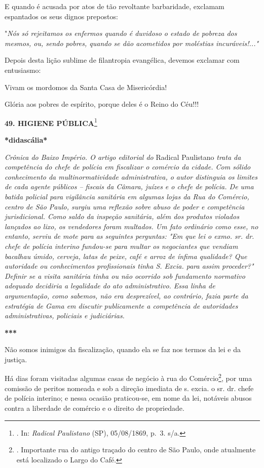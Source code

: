 E quando é acusada por atos de tão revoltante barbaridade, exclamam
espantados os seus dignos prepostos:

"\emph{Nós só rejeitamos os enfermos quando é duvidoso o estado de
pobreza dos mesmos, ou, sendo pobres, quando se dão acometidos por
moléstias incuráveis!..."}

Depois desta lição sublime de filantropia evangélica, devemos exclamar
com entusiasmo:

Vivam os mordomos da Santa Casa de Misericórdia!

Glória aos pobres de espírito, porque deles é o Reino do Céu!!!

\textbf{49. HIGIENE PÚBLICA}\footnote{. In: \emph{Radical Paulistano}
  (SP), 05/08/1869, p.~3. s/a.}

\textbf{*didascália*}

\emph{Crônica do Baixo Império. O artigo editorial do} Radical
Paulistano \emph{trata da competência do chefe de polícia em fiscalizar
o comércio da cidade. Com sólido conhecimento da multinormatividade
administrativa, o autor distinguia os limites de cada agente públicos --
fiscais da Câmara, juízes e o chefe de polícia. De uma batida policial
para vigilância sanitária em algumas lojas da Rua do Comércio, centro de
São Paulo, surgiu uma reflexão sobre abuso de poder e competência
jurisdicional. Como saldo da inspeção sanitária, além dos produtos
violados lançados ao lixo, os vendedores foram multados. Um fato
ordinário como esse, no entanto, serviu de mote para as seguintes
perguntas: "Em que lei o exmo. sr. dr. chefe de polícia interino
fundou-se para multar os negociantes que vendiam bacalhau úmido,
cerveja, latas de peixe, café e arroz de ínfima qualidade? Que
autoridade ou conhecimentos profissionais tinha S. Excia. para assim
proceder?" Definir se a visita sanitária tinha ou não ocorrido sob
fundamento normativo adequado decidiria a legalidade do ato
administrativo. Essa linha de argumentação, como sabemos, não era
desprezível, ao contrário, fazia parte da estratégia de Gama em discutir
publicamente a competência de autoridades administrativas, policiais e
judiciárias.}

\textbf{***}

Não somos inimigos da fiscalização, quando ela se faz nos termos da lei
e da justiça.

Há dias foram visitadas algumas casas de negócio à rua do
Comércio\footnote{. Importante rua do antigo traçado do centro de São
  Paulo, onde atualmente está localizado o Largo do Café.}, por uma
comissão de peritos nomeada e sob a direção imediata de s. excia. o sr.
dr. chefe de polícia interino; e nessa ocasião praticou-se, em nome da
lei, notáveis abusos contra a liberdade de comércio e o direito de
propriedade.

